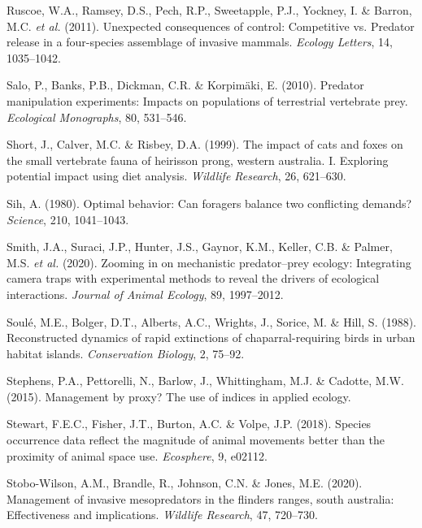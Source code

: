 \documentclass[]{elsarticle} %
\begin{document}
\leavevmode\hypertarget{ref-ruscoe2011}{}%
Ruscoe, W.A., Ramsey, D.S., Pech, R.P., Sweetapple, P.J., Yockney, I. \& Barron, M.C. \emph{et al.} (2011). Unexpected consequences of control: Competitive vs. Predator release in a four-species assemblage of invasive mammals. \emph{Ecology Letters}, 14, 1035--1042.

\leavevmode\hypertarget{ref-https:ux2fux2fdoi.orgux2f10.1890ux2f09-1260.1}{}%
Salo, P., Banks, P.B., Dickman, C.R. \& Korpimäki, E. (2010). Predator manipulation experiments: Impacts on populations of terrestrial vertebrate prey. \emph{Ecological Monographs}, 80, 531--546.

\leavevmode\hypertarget{ref-short1999}{}%
Short, J., Calver, M.C. \& Risbey, D.A. (1999). The impact of cats and foxes on the small vertebrate fauna of heirisson prong, western australia. I. Exploring potential impact using diet analysis. \emph{Wildlife Research}, 26, 621--630.

\leavevmode\hypertarget{ref-SIH1041}{}%
Sih, A. (1980). Optimal behavior: Can foragers balance two conflicting demands? \emph{Science}, 210, 1041--1043.

\leavevmode\hypertarget{ref-smith2020}{}%
Smith, J.A., Suraci, J.P., Hunter, J.S., Gaynor, K.M., Keller, C.B. \& Palmer, M.S. \emph{et al.} (2020). Zooming in on mechanistic predator--prey ecology: Integrating camera traps with experimental methods to reveal the drivers of ecological interactions. \emph{Journal of Animal Ecology}, 89, 1997--2012.

\leavevmode\hypertarget{ref-soule1988}{}%
Soulé, M.E., Bolger, D.T., Alberts, A.C., Wrights, J., Sorice, M. \& Hill, S. (1988). Reconstructed dynamics of rapid extinctions of chaparral-requiring birds in urban habitat islands. \emph{Conservation Biology}, 2, 75--92.

\leavevmode\hypertarget{ref-stephens2015}{}%
Stephens, P.A., Pettorelli, N., Barlow, J., Whittingham, M.J. \& Cadotte, M.W. (2015). Management by proxy? The use of indices in applied ecology.

\leavevmode\hypertarget{ref-stewart2018}{}%
Stewart, F.E.C., Fisher, J.T., Burton, A.C. \& Volpe, J.P. (2018). Species occurrence data reflect the magnitude of animal movements better than the proximity of animal space use. \emph{Ecosphere}, 9, e02112.

\leavevmode\hypertarget{ref-stobo2020management}{}%
Stobo-Wilson, A.M., Brandle, R., Johnson, C.N. \& Jones, M.E. (2020). Management of invasive mesopredators in the flinders ranges, south australia: Effectiveness and implications. \emph{Wildlife Research}, 47, 720--730.
\end{document}
